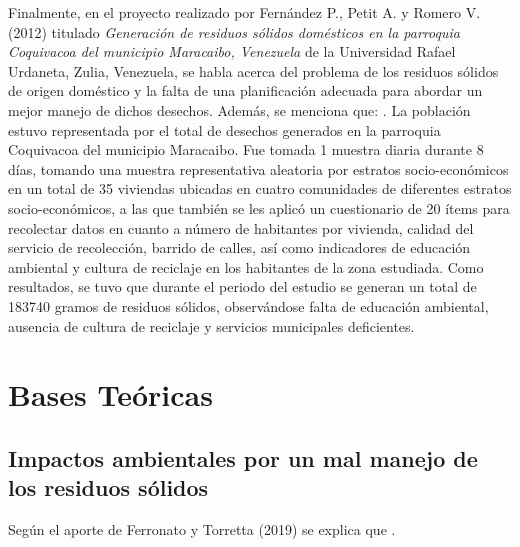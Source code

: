 Finalmente, en el proyecto realizado por Fernández P., Petit A. y Romero V. (2012) titulado \textit{Generación de residuos sólidos domésticos en la parroquia Coquivacoa del municipio Maracaibo, Venezuela} de la Universidad Rafael Urdaneta, Zulia, Venezuela, se habla acerca del problema de los residuos sólidos de origen doméstico y la falta de una planificación adecuada para abordar un mejor manejo de dichos desechos. Además, se menciona que: . La población estuvo representada por el total de desechos generados en la parroquia Coquivacoa del municipio Maracaibo. Fue tomada 1 muestra diaria durante 8 días, tomando una muestra representativa aleatoria por estratos socio-económicos en un total de 35 viviendas ubicadas en cuatro comunidades de diferentes estratos socio-económicos, a las que también se les aplicó un cuestionario de 20 ítems para recolectar datos en cuanto a número de habitantes por vivienda, calidad del servicio de recolección, barrido de calles, así como indicadores de educación ambiental y cultura de reciclaje en los habitantes de la zona estudiada. Como resultados, se tuvo que durante el periodo del estudio se generan un total de 183740 gramos de residuos sólidos, observándose falta de educación ambiental, ausencia de cultura de reciclaje y servicios municipales deficientes.

\newpage

{\setlength{\parskip}{0cm}
\section{Bases Teóricas}

\subsection{Impactos ambientales por un mal manejo de los residuos sólidos}

Según el aporte de Ferronato y Torretta (2019) se explica que .
}

